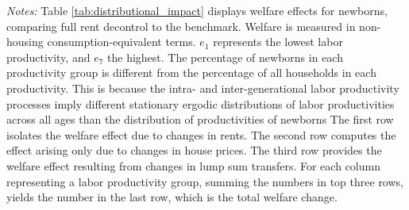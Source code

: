 \documentclass[parskip=full]{article}
\newenvironment{fignote2}[1]
{
\par
\medskip
\begin{minipage}{#1}
\footnotesize
}
{
\end{minipage}
}
\begin{document}
\begin{table}[H]
    \centering
    \caption{Newborns' welfare gains and losses by labor productivity}
    \vspace{-0.5cm}
    \label{tab:distributional_impact}
    
    \vspace{-0.45cm}
    \begin{fignote2}{0.95\textwidth}
      \textit{Notes:} Table \ref{tab:distributional_impact} displays welfare effects for newborns, comparing full rent decontrol to the benchmark. Welfare is measured in non-housing consumption-equivalent terms. $e_{1}$ represents the lowest labor productivity, and $e_{7}$ the highest. The percentage of newborns in each productivity group is different from the percentage of all households in each productivity. This is because the intra- and inter-generational labor productivity processes imply different stationary ergodic distributions of labor productivities across all ages than the distribution of productivities of newborns The first row isolates the welfare effect due to changes in rents. The second row computes the effect arising only due to changes in house prices. The third row provides the welfare effect resulting from changes in lump sum transfers. For each column representing a labor productivity group, summing the numbers in top three rows, yields the number in the last row, which is the total welfare change.
    \end{fignote2}
\end{table}
\end{document}
